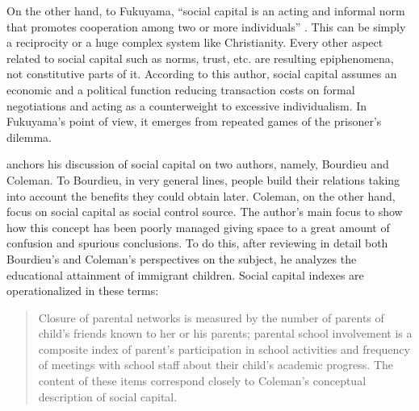 \documentclass[12pt, english]{article}
\begin{document}
On the other hand, to Fukuyama, ``social capital is an acting and informal norm that promotes cooperation among two or more individuals'' \cite[p. 67]{higgins2005fundamentos}. This can be simply a reciprocity or a huge complex system like Christianity. Every other aspect related to social capital such as norms, trust, etc. are resulting epiphenomena, not constitutive parts of it. According to this author, social capital assumes an economic and a political function reducing transaction costs on formal negotiations and acting as a counterweight to excessive individualism. In Fukuyama's point of view, it emerges from repeated games of the prisoner's dilemma.

\cite{portes2000two} anchors his discussion of social capital on two authors, namely, Bourdieu and Coleman. To Bourdieu, in very general lines, people build their relations taking into account the benefits they could obtain later. Coleman, on the other hand, focus on social capital as social control source.  The author's main focus to show how this concept has been poorly managed giving space to a great amount of confusion and spurious conclusions. To do this, after reviewing in detail both Bourdieu's and Coleman's perspectives on the subject, he analyzes the educational attainment of immigrant children. Social capital indexes are operationalized in these terms:

\begin{quotation}
	Closure of parental networks is measured by the number of parents of child's friends known to her or his parents; parental school involvement is a composite index of parent's participation in school activities and frequency of meetings with school staff about their child's academic progress. The content of these items correspond closely to Coleman's conceptual description of social capital. \cite[p. 7]{portes2000two}
\end{quotation}
\end{document}
